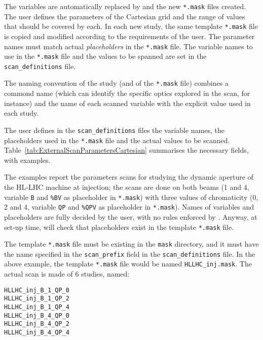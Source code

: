 The variables are automatically
replaced by \SIXDESK{} and the new \texttt{*.mask} files created. The user defines
the parameters of the Cartesian grid and the range of values that should be
covered by each. In each new study, the same template \texttt{*.mask}
file is copied and modified according to the requirements of the user.
The parameter names must match actual \emph{placeholders} in the
\texttt{*.mask} file. The variable names to use in the \texttt{*.mask}
file and the values to be spanned are set in the \texttt{scan\_definitions}
file.

The naming convention of the study (and of the \texttt{*.mask} file)
combines a commond name (which can identify the specific optics explored in
the scan, for instance) and the name of each scanned variable
with the explicit value used in each study.

The user defines in the \texttt{scan\_definitions} files the variable names,
the placeholders used in the \texttt{*.mask} file and the actual values to be
scanned. Table~\ref{tab:ExternalScanParametersCartesian} summarises the necessary
fields, with examples.

The examples report the parameters scans for
studying the dynamic aperture of the HL-LHC machine at injection; the
scans are done on both beams (1 and 4, variable \texttt{B} and \texttt{\%BV}
as placeholder in \texttt{*.mask}) with three values of chromaticity
(0, 2 and 4, variable \texttt{QP} and \texttt{\%QPV} as placeholder in
\texttt{*.mask}). Names of variables and placeholders are fully decided by
the user, with no rules enforced by \SIXDESK{}. Anyway, at set-up time,
\SIXDESK{} will check that placeholders exist in the template
\texttt{*.mask} file.

The template \texttt{*.mask} file must be existing in the \texttt{mask}
directory, and it must have the name specified in the \texttt{scan\_prefix}
field in the \texttt{scan\_definitions} file. In the above example,
the template \texttt{*.mask} file would be named \texttt{HLLHC\_inj.mask}.
The actual scan is made of 6 studies, named:
\begin{lstlisting}
HLLHC_inj_B_1_QP_0
HLLHC_inj_B_1_QP_2
HLLHC_inj_B_1_QP_4
HLLHC_inj_B_4_QP_0
HLLHC_inj_B_4_QP_2
HLLHC_inj_B_4_QP_4
\end{lstlisting}


